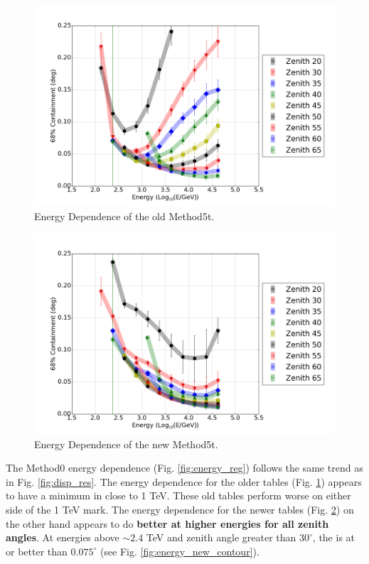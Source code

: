 \documentclass[main.tex]{subfiles}
\begin{document}
\begin{figure}[htbp]
  \centering
  \includegraphics[width=.9\linewidth]{images/disp_standard_energy}
  \caption{Energy Dependence of the old Method5t.}
  \label{fig:energy_disp_standard}    
\end{figure}

\begin{figure}[htbp]
  \centering
  \includegraphics[width=.9\linewidth]{images/disp_450_energy}
  \caption{Energy Dependence of the new Method5t.}
  \label{fig:energy_disp_450}    
\end{figure}

The Method0 energy dependence (Fig. \ref{fig:energy_reg}) follows the same trend as in Fig. \ref{fig:disp_res}. The energy dependence for the older \disp tables (Fig. \ref{fig:energy_disp_standard}) appears to have a minimum in \rse close to 1 TeV. These old \disp tables perform worse on either side of the 1 TeV mark. The energy dependence for the newer \disp tables (Fig. \ref{fig:energy_disp_450}) on the other hand appears to do {\bf better at higher energies for all zenith angles}. At energies above $\sim 2.4$ TeV and zenith angle greater than $30^\circ$, the \rse is at or better than $0.075^\circ$ (see Fig. \ref{fig:energy_new_contour}).
\end{document}
